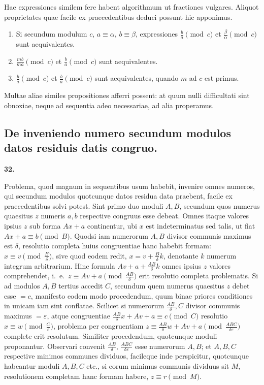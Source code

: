 \documentclass[12pt,a4paper]{article}
\theoremstyle{plain}
\theoremstyle{definition}
\theoremstyle{remark}
\begin{document}
Hae expressiones similem fere habent algorithmum ut fractiones vulgares. Aliquot proprietates quae facile ex praecedentibus deduci possunt hic apponimus.

\begin{enumerate}[label=\arabic*.]
\item Si secundum modulum $c$, $a \equiv \alpha$, $b \equiv \beta$, expressiones $\frac{b}{a} \pmod{c}$ et $\frac{\beta}{\alpha} \pmod{c}$ sunt aequivalentes.
\item $\frac{mb}{ma} \pmod{c}$ et $\frac{b}{a} \pmod{c}$ sunt aequivalentes.
\item $\frac{b}{a} \pmod{c}$ et $\frac{b}{a} \pmod{c}$ sunt aequivalentes, quando $m$ ad $c$ est primus.
\end{enumerate}
Multae aliae similes propositiones afferri possent: at quum nulli difficultati sint obnoxiae, neque ad sequentia adeo necessariae, ad alia properamus.

\vspace{0.5em}
\subsection*{De inveniendo numero secundum modulos datos residuis datis congruo.}

\textbf{32.}

Problema, quod magnum in sequentibus usum habebit, invenire omnes numeros, qui secundum modulos quotcunque datos residua data praebent, facile ex praecedentibus solvi potest. Sint primo duo moduli $A, B$, secundum quos numerus quaesitus $z$ numeris $a, b$ respective congruus esse debeat. Omnes itaque valores ipsius $z$ sub forma $Ax + a$ continentur, ubi $x$ est indeterminatus sed talis, ut fiat $Ax + a \equiv b \pmod{B}$. Quodsi iam numerorum $A, B$ divisor communis maximus est $\delta$, resolutio completa huius congruentiae hanc habebit formam: $x \equiv v \pmod{\frac{B}{\delta}}$, sive quod eodem redit, $x = v + \frac{B}{\delta}k$, denotante $k$ numerum integrum arbitrarium. Hinc formula $Av + a + \frac{AB}{\delta}k$ omnes ipsius $z$ valores comprehendet, i.~e.\ $z \equiv Av + a \pmod{\frac{AB}{\delta}}$ erit resolutio completa problematis. Si ad modulos $A, B$ tertius accedit $C$, secundum quem numerus quaesitus $z$ debet esse $= c$, manifesto eodem modo procedendum, quum binae priores conditiones in unicam iam sint conflatae. Scilicet si numerorum $\frac{AB}{\delta}, C$ divisor communis maximus $= \varepsilon$, atque congruentiae $\frac{AB}{\delta}x + Av + a \equiv c \pmod{C}$ resolutio $x \equiv w \pmod{\frac{C}{\varepsilon}}$, problema per congruentiam $z \equiv \frac{AB}{\delta}w + Av + a \pmod{\frac{ABC}{\delta\varepsilon}}$ complete erit resolutum. Similiter procedendum, quotcunque moduli proponantur. Observari convenit $\frac{AB}{\delta}$, $\frac{ABC}{\delta\varepsilon}$ esse numerorum $A, B$; et $A, B, C$ respective minimos communes dividuos, facileque inde perspicitur, quotcunque habeantur moduli $A, B, C$ etc., si eorum minimus communis dividuus sit $M$, resolutionem completam hanc formam habere, $z \equiv r \pmod{M}$.
\end{document}
